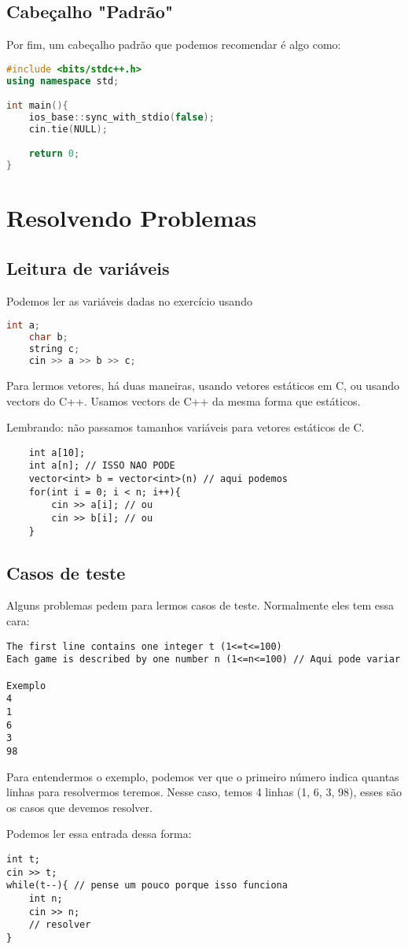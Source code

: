 \documentclass{article}
\begin{document}
\subsection{Cabeçalho "Padrão"}
Por fim, um cabeçalho padrão que podemos recomendar é algo como:

\begin{lstlisting}[language=C++]
#include <bits/stdc++.h>
using namespace std;

int main(){
    ios_base::sync_with_stdio(false);
    cin.tie(NULL);

    return 0;
}

\end{lstlisting}

\section{Resolvendo Problemas}
\subsection{Leitura de variáveis}
Podemos ler as variáveis dadas no exercício usando

\begin{lstlisting}[language=C++]
    int a;
    char b;
    string c;
    cin >> a >> b >> c;
\end{lstlisting}

Para lermos vetores, há duas maneiras, usando vetores estáticos em C, ou usando vectors do C++.
Usamos vectors de C++ da mesma forma que estáticos.

Lembrando: não passamos tamanhos variáveis para vetores estáticos de C.

\begin{lstlisting}
    int a[10];
    int a[n]; // ISSO NAO PODE
    vector<int> b = vector<int>(n) // aqui podemos
    for(int i = 0; i < n; i++){
        cin >> a[i]; // ou
        cin >> b[i]; // ou
    } 
\end{lstlisting}

\subsection{Casos de teste}
Alguns problemas pedem para lermos casos de teste.
Normalmente eles tem essa cara:

\begin{verbatim}
The first line contains one integer t (1<=t<=100)
Each game is described by one number n (1<=n<=100) // Aqui pode variar

Exemplo
4
1
6
3
98
\end{verbatim}

Para entendermos o exemplo, podemos ver que o primeiro número indica quantas linhas para resolvermos teremos.
Nesse caso, temos 4 linhas (1, 6, 3, 98), esses são os casos que devemos resolver.

Podemos ler essa entrada dessa forma:

\begin{lstlisting}
int t;
cin >> t;
while(t--){ // pense um pouco porque isso funciona
    int n;
    cin >> n;
    // resolver
}
\end{lstlisting}
\end{document}
